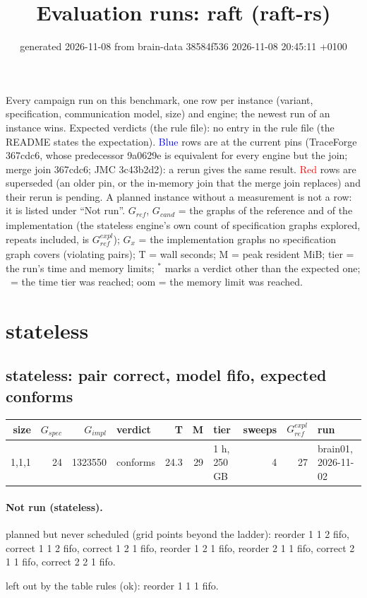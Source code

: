 \documentclass[10pt]{article}
\title{Evaluation runs: \textsf{raft} (raft-rs)}
\author{}
\date{generated 2026-11-08 from brain-data 38584f536 2026-11-08 20:45:11 +0100}
\begin{document}
\maketitle\small
\noindent Every campaign run on this benchmark, one row per instance (variant, specification, communication model, size) and engine; the newest run of an instance wins. Expected verdicts (the rule file): no entry in the rule file (the README states the expectation). \textcolor{blue}{Blue} rows are at the current pins (TraceForge 367cdc6, whose predecessor 9a0629e is equivalent for every engine but the join; merge join 367cdc6; JMC 3c43b2d2): a rerun gives the same result. \textcolor{red}{Red} rows are superseded (an older pin, or the in-memory join that the merge join replaces) and their rerun is pending. A planned instance without a measurement is not a row: it is listed under ``Not run''. $G_{\mathit{ref}}$, $G_{\mathit{cand}}$ = the graphs of the reference and of the implementation (the stateless engine's own count of specification graphs explored, repeats included, is $G_{\mathit{ref}}^{\mathit{expl}}$); $G_x$ = the implementation graphs no specification graph covers (violating pairs); T = wall seconds; M = peak resident MiB; tier = the run's time and memory limits; $^{\ast}$ marks a verdict other than the expected one; \faClock\ = the time tier was reached; oom = the memory limit was reached.

\section*{stateless}
\subsection*{stateless: pair \textsf{correct}, model fifo, expected conforms}
\begin{longtable}{@{}rrrlrrlrrl@{}}
\toprule
size & $G_{\mathit{spec}}$ & $G_{\mathit{impl}}$ & verdict & T & M & tier & sweeps & $G_{\mathit{ref}}^{\mathit{expl}}$ & run \\
\midrule
\endhead
\color{blue} 1,1,1 & 24 & 1323550 & conforms & 24.3 & 29 & 1 h, 250 GB & 4 & 27 & brain01, 2026-11-02 \\
\bottomrule
\end{longtable}
\paragraph{Not run (stateless).}
planned but never scheduled (grid points beyond the ladder): reorder 1 1 2 fifo, correct 1 1 2 fifo, correct 1 2 1 fifo, reorder 1 2 1 fifo, reorder 2 1 1 fifo, correct 2 1 1 fifo, correct 2 2 1 fifo.\par
left out by the table rules (ok): reorder 1 1 1 fifo.\par
\end{document}
